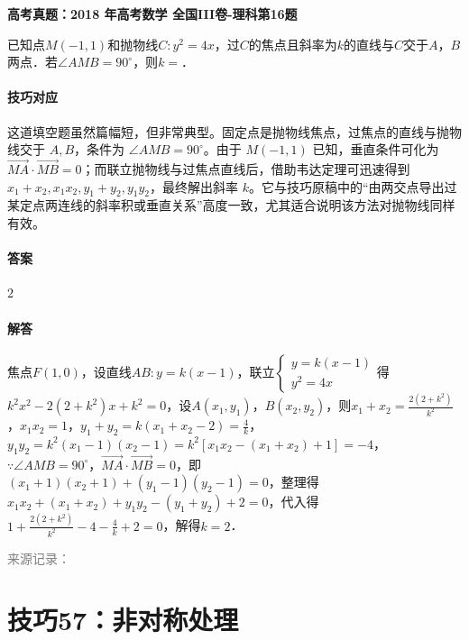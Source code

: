 \documentclass[UTF8,a4paper,11pt]{ctexart}
\newenvironment{gaokao}[1]{\par\medskip\noindent\textbf{高考真题：#1}\par\smallskip}{\par\medskip}
\begin{document}
\begin{gaokao}{2018 年高考数学 全国III卷-理科第16题}

已知点$M(-1,1)$和抛物线$C:y^2=4x$，过$C$的焦点且斜率为$k$的直线与$C$交于$A$，$B$两点．若$\angle AMB=90^\circ$，则$k=$\underline{\hspace{3cm}}．

\paragraph{技巧对应}

这道填空题虽然篇幅短，但非常典型。固定点是抛物线焦点，过焦点的直线与抛物线交于 $A,B$，条件为 $\angle AMB=90^\circ$。由于 $M(-1,1)$ 已知，垂直条件可化为 $\overrightarrow{MA}\cdot\overrightarrow{MB}=0$；而联立抛物线与过焦点直线后，借助韦达定理可迅速得到 $x_1+x_2,x_1x_2,y_1+y_2,y_1y_2$，最终解出斜率 $k$。它与技巧原稿中的“由两交点导出过某定点两连线的斜率积或垂直关系”高度一致，尤其适合说明该方法对抛物线同样有效。

\paragraph{答案}

$2$

\paragraph{解答}

焦点$F(1,0)$，设直线$AB:y=k(x-1)$，联立$\begin{cases}y=k(x-1)\\y^2=4x\end{cases}$得$k^2x^2-2(2+k^2)x+k^2=0$，设$A(x_1,y_1)$，$B(x_2,y_2)$，则$x_1+x_2=\frac{2(2+k^2)}{k^2}$，$x_1x_2=1$，$y_1+y_2=k(x_1+x_2-2)=\frac{4}{k}$，$y_1y_2=k^2(x_1-1)(x_2-1)=k^2[x_1x_2-(x_1+x_2)+1]=-4$，$\because \angle AMB=90^\circ$，$\overrightarrow{MA}\cdot\overrightarrow{MB}=0$，即$(x_1+1)(x_2+1)+(y_1-1)(y_2-1)=0$，整理得$x_1x_2+(x_1+x_2)+y_1y_2-(y_1+y_2)+2=0$，代入得$1+\frac{2(2+k^2)}{k^2}-4-\frac{4}{k}+2=0$，解得$k=2$．

\par\smallskip\textcolor{gray}{\footnotesize 来源记录：\texttt{}}

\end{gaokao}

\clearpage

\section{技巧57：非对称处理}
\end{document}
